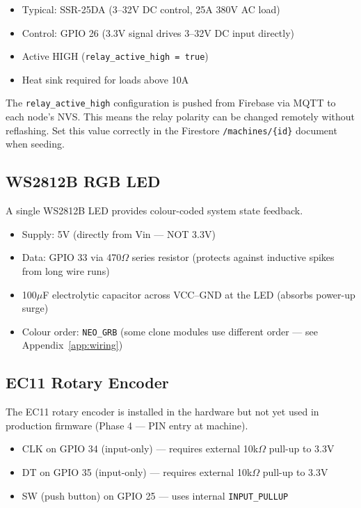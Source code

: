 \begin{itemize}[leftmargin=1.5em]
    \item Typical: SSR-25DA (3--32V DC control, 25A 380V AC load)
    \item Control: GPIO 26 (3.3V signal drives 3--32V DC input directly)
    \item Active HIGH (\texttt{relay\_active\_high = true})
    \item Heat sink required for loads above 10A
\end{itemize}

\begin{notebox}
The \texttt{relay\_active\_high} configuration is pushed from Firebase via MQTT to each node's NVS. This means the relay polarity can be changed remotely without reflashing. Set this value correctly in the Firestore \texttt{/machines/\{id\}} document when seeding.
\end{notebox}

\subsection{WS2812B RGB LED}

A single WS2812B LED provides colour-coded system state feedback.

\begin{itemize}[leftmargin=1.5em]
    \item Supply: 5V (directly from Vin --- NOT 3.3V)
    \item Data: GPIO 33 via 470$\Omega$ series resistor (protects against inductive spikes from long wire runs)
    \item 100$\mu$F electrolytic capacitor across VCC--GND at the LED (absorbs power-up surge)
    \item Colour order: \texttt{NEO\_GRB} (some clone modules use different order --- see Appendix~\ref{app:wiring})
\end{itemize}

\subsection{EC11 Rotary Encoder}

The EC11 rotary encoder is installed in the hardware but not yet used in production firmware (Phase 4 --- PIN entry at machine).

\begin{itemize}[leftmargin=1.5em]
    \item CLK on GPIO 34 (input-only) --- requires external 10k$\Omega$ pull-up to 3.3V
    \item DT on GPIO 35 (input-only) --- requires external 10k$\Omega$ pull-up to 3.3V
    \item SW (push button) on GPIO 25 --- uses internal \texttt{INPUT\_PULLUP}
\end{itemize}

